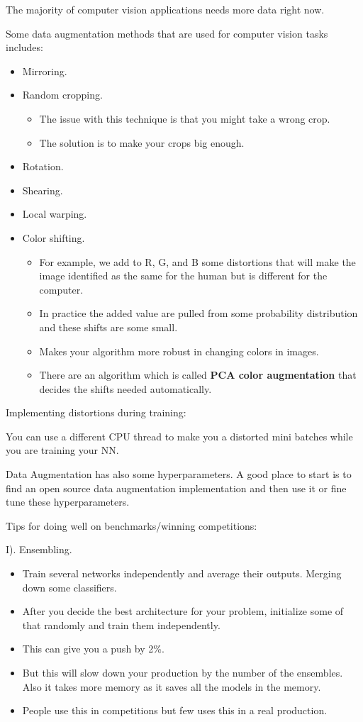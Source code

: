 The majority of computer vision applications needs more data right now.

Some data augmentation methods that are used for computer vision tasks includes:

\begin{itemize}
    \item Mirroring.
    \item Random cropping.
    \begin{itemize}
        \item The issue with this technique is that you might take a wrong crop.
        \item The solution is to make your crops big enough.
    \end{itemize}
    \item Rotation.
    \item Shearing.
    \item Local warping.
    \item Color shifting.
    \begin{itemize}
        \item For example, we add to R, G, and B some distortions that will make the image identified as the same for the human but is different for the computer.
        \item In practice the added value are pulled from some probability distribution and these shifts are some small.
        \item Makes your algorithm more robust in changing colors in images.
        \item There are an algorithm which is called \textbf{PCA color augmentation} that decides the shifts needed automatically.
    \end{itemize}
\end{itemize}

Implementing distortions during training:

You can use a different CPU thread to make you a distorted mini batches while you are training your NN.

Data Augmentation has also some hyperparameters. A good place to start is to find an open source data augmentation implementation and then use it or fine tune these hyperparameters.

Tips for doing well on benchmarks/winning competitions:

I). Ensembling.
\begin{itemize}
    \item Train several networks independently and average their outputs. Merging down some classifiers.
    \item After you decide the best architecture for your problem, initialize some of that randomly and train them independently.
    \item This can give you a push by 2\%.
    \item But this will slow down your production by the number of the ensembles. Also it takes more memory as it saves all the models in the memory.
    \item People use this in competitions but few uses this in a real production.
\end{itemize}

